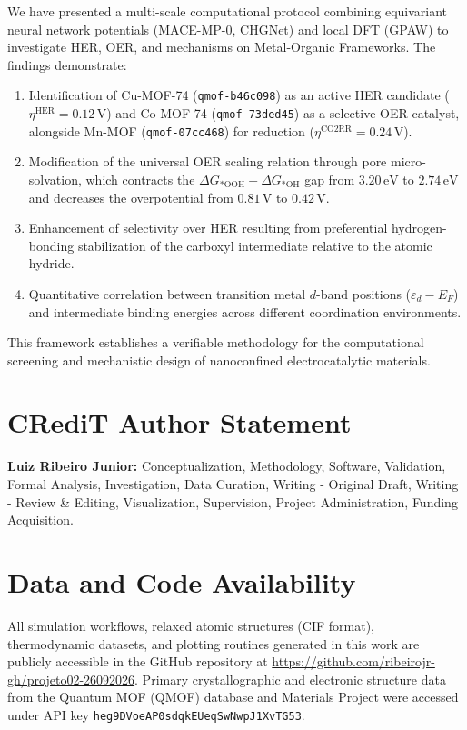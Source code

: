 \documentclass[journal=jacsat,manuscript=article]{achemso}
\begin{document}
We have presented a multi-scale computational protocol combining equivariant neural network potentials (MACE-MP-0, CHGNet) and local DFT (GPAW) to investigate HER, OER, and  mechanisms on Metal-Organic Frameworks. The findings demonstrate:
\begin{enumerate}
    \item Identification of Cu-MOF-74 (\texttt{qmof-b46c098}) as an active HER candidate ($\eta^{\text{HER}} = 0.12\,\text{V}$) and Co-MOF-74 (\texttt{qmof-73ded45}) as a selective OER catalyst, alongside Mn-MOF (\texttt{qmof-07cc468}) for  reduction ($\eta^{\text{CO2RR}} = 0.24\,\text{V}$).
    \item Modification of the universal OER scaling relation through pore micro-solvation, which contracts the $\Delta G_{*\text{OOH}} - \Delta G_{*\text{OH}}$ gap from $3.20\,\text{eV}$ to $2.74\,\text{eV}$ and decreases the overpotential from $0.81\,\text{V}$ to $0.42\,\text{V}$.
    \item Enhancement of  selectivity over HER resulting from preferential hydrogen-bonding stabilization of the carboxyl intermediate relative to the atomic hydride.
    \item Quantitative correlation between transition metal $d$-band positions ($\varepsilon_d - E_F$) and intermediate binding energies across different coordination environments.
\end{enumerate}
This framework establishes a verifiable methodology for the computational screening and mechanistic design of nanoconfined electrocatalytic materials.

\section*{CRediT Author Statement}
\textbf{Luiz Ribeiro Junior:} Conceptualization, Methodology, Software, Validation, Formal Analysis, Investigation, Data Curation, Writing - Original Draft, Writing - Review \& Editing, Visualization, Supervision, Project Administration, Funding Acquisition.

\section*{Data and Code Availability}
All simulation workflows, relaxed atomic structures (CIF format), thermodynamic datasets, and plotting routines generated in this work are publicly accessible in the GitHub repository at \url{https://github.com/ribeirojr-gh/projeto02-26092026}. Primary crystallographic and electronic structure data from the Quantum MOF (QMOF) database and Materials Project were accessed under API key \texttt{heg9DVoeAP0sdqkEUeqSwNwpJ1XvTG53}.
\end{document}
